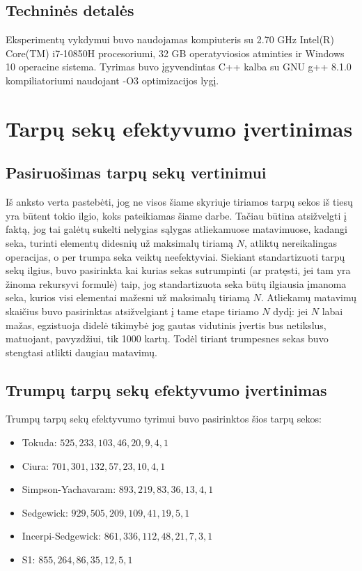 \documentclass{VUMIFInfKursinis}
\begin{document}
\subsection{Techninės detalės}
Eksperimentų vykdymui buvo naudojamas kompiuteris su 2.70 GHz Intel(R) Core(TM) i7-10850H procesoriumi,
32 GB operatyviosios atminties ir Windows 10 operacine sistema.
Tyrimas buvo įgyvendintas C++ kalba su GNU g++ 8.1.0 kompiliatoriumi naudojant -O3 optimizacijos lygį.

\section{Tarpų sekų efektyvumo įvertinimas}

\subsection{Pasiruošimas tarpų sekų vertinimui}

Iš anksto verta pastebėti, jog ne visos šiame skyriuje tiriamos tarpų sekos iš tiesų yra būtent tokio ilgio, koks pateikiamas šiame darbe.
Tačiau būtina atsižvelgti į faktą, jog tai galėtų sukelti nelygias sąlygas atliekamuose matavimuose,
kadangi seka, turinti elementų didesnių už maksimalų tiriamą $N$, atliktų nereikalingas operacijas, o per trumpa seka veiktų neefektyviai.
Siekiant standartizuoti tarpų sekų ilgius, buvo pasirinkta kai kurias sekas sutrumpinti (ar pratęsti, jei tam yra žinoma rekursyvi formulė)
taip, jog standartizuota seka būtų ilgiausia įmanoma seka, kurios visi elementai mažesni už maksimalų tiriamą $N$.
Atliekamų matavimų skaičius buvo pasirinktas atsižvelgiant į tame etape tiriamo $N$ dydį: jei $N$ labai mažas,
egzistuoja didelė tikimybė jog gautas vidutinis įvertis bus netikslus, matuojant, pavyzdžiui, tik 1000 kartų.
Todėl tiriant trumpesnes sekas buvo stengtasi atlikti daugiau matavimų.

\subsection{Trumpų tarpų sekų efektyvumo įvertinimas}
Trumpų tarpų sekų efektyvumo tyrimui buvo pasirinktos šios tarpų sekos:
\begin{itemize}
  \item Tokuda: $525,233,103,46,20,9,4,1$ \cite{10.5555/645569.659879}
  \item Ciura: $701,301,132,57,23,10,4,1$ \cite{ciura2001best}
  \item Simpson-Yachavaram: $893,219,83,36,13,4,1$ \cite{simpson1999faster}
  \item Sedgewick: $929,505,209,109,41,19,5,1$ \cite{SEDGEWICK1986159}
  \item Incerpi-Sedgewick: $861,336,112,48,21,7,3,1$ \cite{incerpi1985improved}
  \item S1: $855,264,86,35,12,5,1$
\end{itemize}
\end{document}
